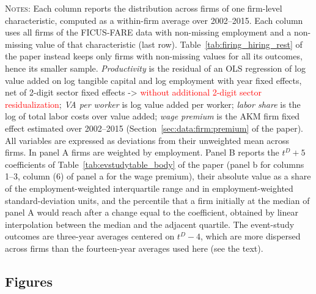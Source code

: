 \documentclass[11pt]{article}
\begin{document}
\begin{table}[h!]
\centering
\caption{Dispersion of firm-level characteristics across firms, 2002--2015 averages (Appendix Table~\ref{apptab:dispersion} of the paper)}
\label{tab:R3_dispersion}
{\footnotesize
}

\par\medskip
\begin{minipage}{0.95\linewidth}\footnotesize\justifying\textsc{Notes}: Each column reports the distribution across firms of one firm-level characteristic, computed as a within-firm average over 2002--2015. Each column uses all firms of the FICUS-FARE data with non-missing employment and a non-missing value of that characteristic (last row). Table~\ref{tab:firing_hiring_rest} of the paper instead keeps only firms with non-missing values for all its outcomes, hence its smaller sample. \textit{Productivity} is the residual of an OLS regression of log value added on log tangible capital and log employment with year fixed effects, net of 2-digit sector fixed effects -> \textcolor{red}{without additional 2-digit sector residualization}; \textit{VA per worker} is log value added per worker; \textit{labor share} is the log of total labor costs over value added; \textit{wage premium} is the AKM firm fixed effect estimated over 2002--2015 (Section~\ref{sec:data:firm:premium} of the paper). All variables are expressed as deviations from their unweighted mean across firms. In panel A firms are weighted by employment. Panel B reports the $t^D+5$ coefficients of Table~\ref{tab:evstudytable_body} of the paper (panel b for columns 1--3, column (6) of panel a for the wage premium), their absolute value as a share of the employment-weighted interquartile range and in employment-weighted standard-deviation units, and the percentile that a firm initially at the median of panel A would reach after a change equal to the coefficient, obtained by linear interpolation between the median and the adjacent quartile. The event-study outcomes are three-year averages centered on $t^D-4$, which are more dispersed across firms than the fourteen-year averages used here (see the text).\end{minipage}
\end{table}

\clearpage
\subsection*{Figures}
\end{document}
